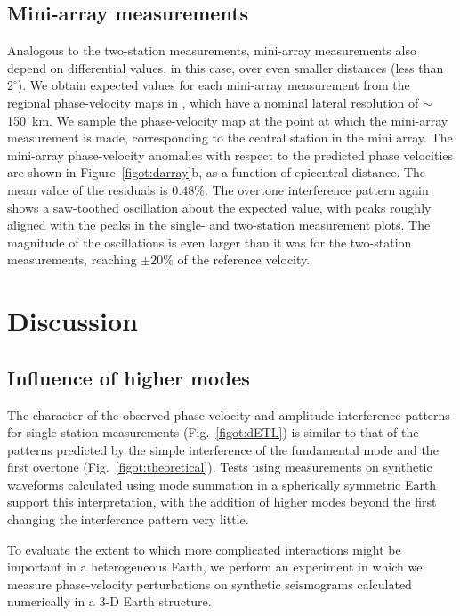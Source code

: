 \documentclass[12pt,oneside]{book}
\newcommand{\degree}[1]{\mbox{$#1^{\circ}$}}
\begin{document}
\subsection{Mini-array measurements}
Analogous to the two-station measurements, mini-array measurements also depend on differential values, in this case, over even smaller distances (less than \degree{2}). We obtain expected values for each mini-array measurement from the regional phase-velocity maps in \citet{Fosteretal2014}, which have a nominal lateral resolution of $\sim$150~km. We sample the phase-velocity map at the point at which the mini-array measurement is made, corresponding to the central station in the mini array. The mini-array phase-velocity anomalies with respect to the predicted phase velocities are shown in Figure~\ref{figot:darray}b, as a function of epicentral distance. The mean value of the residuals is $0.48$\%. The overtone interference pattern again shows a saw-toothed oscillation about the expected value, with peaks roughly aligned with the peaks in the single- and two-station measurement plots. The magnitude of the oscillations is even larger than it was for the two-station measurements, reaching $\pm20\%$ of the reference velocity. 

\section{Discussion}
\subsection{Influence of higher modes}
The character of the observed phase-velocity and amplitude interference patterns for single-station measurements (Fig.~\ref{figot:dETL}) is similar to that of the patterns predicted by the simple interference of the fundamental mode and the first overtone (Fig.~\ref{figot:theoretical}). Tests using measurements on synthetic waveforms calculated using mode summation in a spherically symmetric Earth support this interpretation, with the addition of higher modes beyond the first changing the interference pattern very little.  

To evaluate the extent to which more complicated interactions might be important in a heterogeneous Earth, we perform an experiment in which we measure phase-velocity perturbations on synthetic seismograms calculated numerically in a 3\nobreakdash-D Earth structure. 
\end{document}
